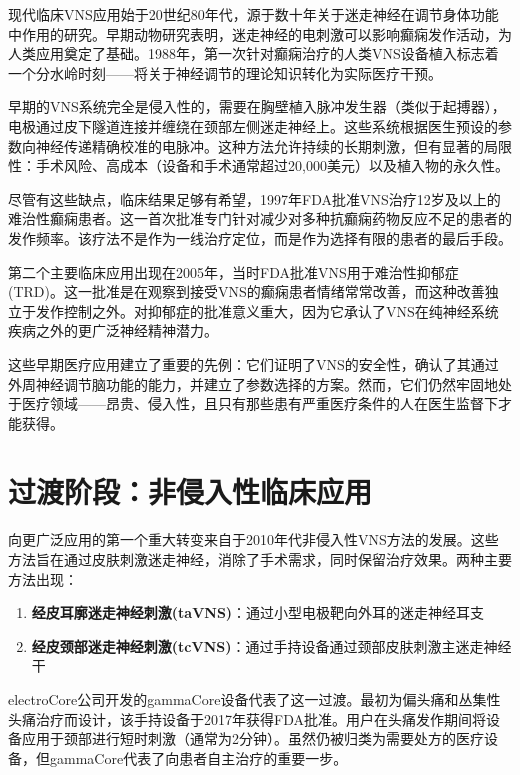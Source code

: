 \documentclass[
  Letterpaper,
]{scrbook}
\providecommand{\tightlist}{%
  \setlength{\itemsep}{0pt}\setlength{\parskip}{0pt}}\usepackage{longtable,booktabs,array}
\begin{document}
现代临床VNS应用始于20世纪80年代，源于数十年关于迷走神经在调节身体功能中作用的研究。早期动物研究表明，迷走神经的电刺激可以影响癫痫发作活动，为人类应用奠定了基础。1988年，第一次针对癫痫治疗的人类VNS设备植入标志着一个分水岭时刻------将关于神经调节的理论知识转化为实际医疗干预。

早期的VNS系统完全是侵入性的，需要在胸壁植入脉冲发生器（类似于起搏器），电极通过皮下隧道连接并缠绕在颈部左侧迷走神经上。这些系统根据医生预设的参数向神经传递精确校准的电脉冲。这种方法允许持续的长期刺激，但有显著的局限性：手术风险、高成本（设备和手术通常超过20,000美元）以及植入物的永久性。

尽管有这些缺点，临床结果足够有希望，1997年FDA批准VNS治疗12岁及以上的难治性癫痫患者。这一首次批准专门针对减少对多种抗癫痫药物反应不足的患者的发作频率。该疗法不是作为一线治疗定位，而是作为选择有限的患者的最后手段。

第二个主要临床应用出现在2005年，当时FDA批准VNS用于难治性抑郁症(TRD)。这一批准是在观察到接受VNS的癫痫患者情绪常常改善，而这种改善独立于发作控制之外。对抑郁症的批准意义重大，因为它承认了VNS在纯神经系统疾病之外的更广泛神经精神潜力。

这些早期医疗应用建立了重要的先例：它们证明了VNS的安全性，确认了其通过外周神经调节脑功能的能力，并建立了参数选择的方案。然而，它们仍然牢固地处于医疗领域------昂贵、侵入性，且只有那些患有严重医疗条件的人在医生监督下才能获得。

\section{过渡阶段：非侵入性临床应用}\label{ux8fc7ux6e21ux9636ux6bb5ux975eux4fb5ux5165ux6027ux4e34ux5e8aux5e94ux7528}

向更广泛应用的第一个重大转变来自于2010年代非侵入性VNS方法的发展。这些方法旨在通过皮肤刺激迷走神经，消除了手术需求，同时保留治疗效果。两种主要方法出现：

\begin{enumerate}
\def\labelenumi{\arabic{enumi}.}
\tightlist
\item
  \textbf{经皮耳廓迷走神经刺激(taVNS)}：通过小型电极靶向外耳的迷走神经耳支
\item
  \textbf{经皮颈部迷走神经刺激(tcVNS)}：通过手持设备通过颈部皮肤刺激主迷走神经干
\end{enumerate}

electroCore公司开发的gammaCore设备代表了这一过渡。最初为偏头痛和丛集性头痛治疗而设计，该手持设备于2017年获得FDA批准。用户在头痛发作期间将设备应用于颈部进行短时刺激（通常为2分钟）。虽然仍被归类为需要处方的医疗设备，但gammaCore代表了向患者自主治疗的重要一步。
\end{document}
